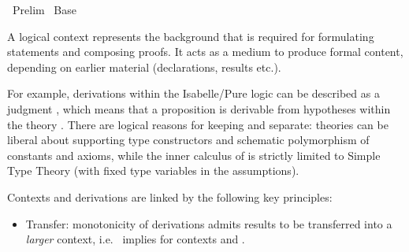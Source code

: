 %
\begin{isabellebody}%
\def\isabellecontext{Prelim}%
%
\isadelimtheory
%
\endisadelimtheory
%
\isatagtheory
{}\isamarkupfalse%
\ Prelim\isanewline
{}\ Base\isanewline
{}%
\endisatagtheory
{\isafoldtheory}%
%
\isadelimtheory
%
\endisadelimtheory
%
\isamarkuptrue%
%
\isamarkuptrue%
%
\begin{isamarkuptext}%
A logical context represents the background that is required for
  formulating statements and composing proofs.  It acts as a medium to
  produce formal content, depending on earlier material (declarations,
  results etc.).

  For example, derivations within the Isabelle/Pure logic can be
  described as a judgment , which means that a
  proposition  is derivable from hypotheses 
  within the theory .  There are logical reasons for
  keeping  and  separate: theories can be
  liberal about supporting type constructors and schematic
  polymorphism of constants and axioms, while the inner calculus of
   is strictly limited to Simple Type Theory (with
  fixed type variables in the assumptions).

  \medskip Contexts and derivations are linked by the following key
  principles:

  \begin{itemize}

  \item Transfer: monotonicity of derivations admits results to be
  transferred into a \emph{larger} context, i.e.\  implies  for contexts  and .


\end{itemize}
\end{isamarkuptext}
\end{isabellebody}
